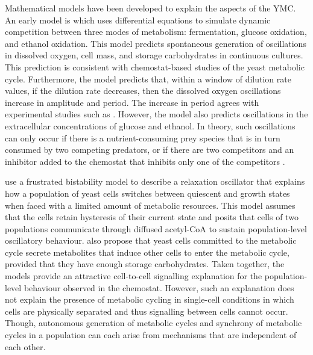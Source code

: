 Mathematical models have been developed to explain the aspects of the YMC\@.
An early model is \textcite{jonesCyberneticModelGrowth1999} which uses differential equations to simulate dynamic competition between three modes of metabolism: fermentation, glucose oxidation, and ethanol oxidation.
This model predicts spontaneous generation of oscillations in dissolved oxygen, cell mass, and storage carbohydrates in continuous cultures.
This prediction is consistent with chemostat-based studies of the yeast metabolic cycle.
Furthermore, the model predicts that, within a window of dilution rate values, if the dilution rate decreases, then the dissolved oxygen oscillations increase in amplitude and period.
The increase in period agrees with experimental studies such as \textcite{oneillEukaryoticCellBiology2020}.
However, the model also predicts oscillations in the extracellular concentrations of glucose and ethanol.
In theory, such oscillations can only occur if there is a nutrient-consuming prey species that is in turn consumed by two competing predators, or if there are two competitors and an inhibitor added to the chemostat that inhibits only one of the competitors \parencite{smithTheoryChemostatDynamics1995}. %

\textcite{krishnaMinimalPushPull2018} use a frustrated bistability model to describe a relaxation oscillator that explains how a population of yeast cells switches between quiescent and growth states when faced with a limited amount of metabolic resources.
This model assumes that the cells retain hysteresis of their current state and posits that cells of two populations communicate through diffused acetyl-CoA to sustain population-level oscillatory behaviour.
\textcite{burnettiCellCycleStart2016} also propose that yeast cells committed to the metabolic cycle secrete metabolites that induce other cells to enter the metabolic cycle, provided that they have enough storage carbohydrates.
Taken together, the models provide an attractive cell-to-cell signalling explanation for the population-level behaviour observed in the chemostat.
However, such an explanation does not explain the presence of metabolic cycling in single-cell conditions in which cells are physically separated and thus signalling between cells cannot occur.
Though, autonomous generation of metabolic cycles and synchrony of metabolic cycles in a population can each arise from mechanisms that are independent of each other.

